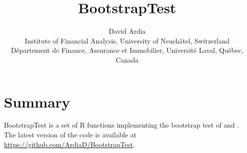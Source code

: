\documentclass[11pt]{article}
\begin{document}
\title{BootstrapTest}
\author{David Ardia\\
Institute of Financial Analysis, University of Neuch\^atel, Switzerland\\
D\'epartement de Finance, Assurance et Immobilier, Universit\'e Laval, Qu\'ebec, Canada}
	
\maketitle

\section*{Summary}

BootstrapTest is a set of R functions \citep{R} implementing the bootstrap test of
\citet{ArdiaEtAl2016a} and \citet{ArdiaEtAl2016b}. The latest version of the code is 
available at \url{https://github.com/ArdiaD/BootstrapTest}.



	
\end{document}
